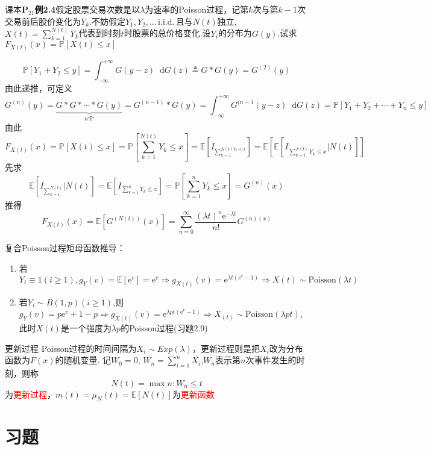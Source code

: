 \documentclass{elegantbook}
\newcommand\iid{\,\text{i.i.d.}\,}
\renewcommand\d{\mathop{}\!\mathrm{d}}
\newcommand\p{\mathbb{P}}
\newcommand\e{\mathrm{e}}
\newcommand\E{\mathbb{E}}
\begin{document}
\begin{example}
    课本$\mathbf{P}_{21}$\textbf{例2.4}假定股票交易次数是以$\lambda$为速率的Poisson过程，记第$k$次与第$k-1$次交易前后股价变化为$Y_k$.不妨假定$Y_1,Y_2,\dots \iid$且与$N(t)$独立,$X(t)=\sum_{k=1}^{N(t)}Y_k$代表到时刻$t$时股票的总价格变化.设$Y_i$的分布为$G(y)$,试求$F_{X(t)}(x)=\p [X(t)\leq x]$
    \begin{solution}
        \[\p [Y_1+Y_2 \leq y]=\int_{-\infty}^{+\infty}G(y-z)\d G(z)\triangleq G*G(y)=G^{(2)}(y) \]
        由此递推，可定义
        \[G^{(n)}(y)=\underbrace{G*G*\cdots *G(y)}_{n\text{个}}=G^{(n-1)}*G(y)=\int_{-\infty}^{+\infty}G^{(n-1}(y-z)\d G(z)=\p [Y_1+Y_2+\cdots +Y_n\leq y]\]
        由此\[F_{X(t)}(x)=\p [X(t)\leq x]=\p [\sum_{k=1}^{N(t)}Y_k\leq x]=\E [I_{\sum_{k=1}^{N(t)Y_k\leq x}}]=\E [\E [I_{\sum_{k=1}^{N(t)}Y_k\leq x}|N(t)]]\]
        先求\[\E [I_{\sum_{k=1}^{N(t)}}|N(t)]=\E [I_{\sum_{k=1}^{n}Y_k\leq x}]=\p [\sum_{k=1}^{n}Y_k\leq x]=G^{(n)}(x)\]
        推得\[F_{X(t)}(x)=\E [G^{(N(t))}(x)]=\sum_{n=0}^{\infty}\frac{(\lambda t)^n\e ^{-\lambda t}}{n!}G^{(n)(x)}\]
    \end{solution}
\end{example}

\begin{remark}
    复合Poisson过程矩母函数推导：
    \begin{enumerate}
        \item 若$Y_i\equiv 1(i\geq 1),g_Y(v)=\E [\e ^{v}]=\e ^{v}\Rightarrow g_{X(t)}(v)=\e ^{\lambda t(\e ^{v}-1)}\Rightarrow X(t)\sim \text{Poisson}(\lambda t)$
        \item 若$Y_i\sim B(1,p)(i\geq 1)$,则$g_Y(v)=p\e ^{v}+1-p\Rightarrow g_{X(t)}(v)=\e ^{\lambda pt(\e ^{v}-1)}\Rightarrow X_(t)\sim \text{Poisson}(\lambda pt)$,此时$X(t)$是一个强度为$\lambda p$的Poisson过程(习题2.9)
    \end{enumerate}
\end{remark}

\begin{definition}{更新过程}{}
    Poisson过程的时间间隔为$X_i\sim Exp(\lambda )$，更新过程则是把$X_i$改为分布函数为$F(x)$的随机变量.
    记$W_0=0,\, W_n=\sum_{i=1}^{n}X_i$,$W_n$表示第$n$次事件发生的时刻，则称
    \[N(t)=\max {n:W_n\leq t}\]为\textcolor{red}{更新过程}，$m(t)=\mu _N(t)=\E [N(t)]$为\textcolor{red}{更新函数}
\end{definition}

\section{习题}
\end{document}
